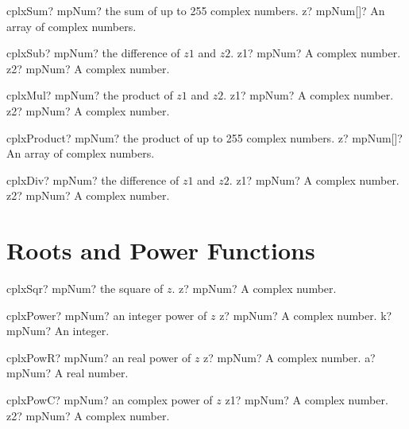 \documentclass[12pt,a4paper,openany]{book}
\begin{document}
\begin{mpFunctionsExtract}
\mpFunctionOne
{cplxSum? mpNum? the sum of up to 255 complex numbers.}
{z? mpNum[]? An array of complex numbers.}
\end{mpFunctionsExtract}

\begin{mpFunctionsExtract}
\mpFunctionTwo
{cplxSub? mpNum? the difference of $z1$ and $z2$.}
{z1? mpNum? A complex number.}
{z2? mpNum? A complex number.}
\end{mpFunctionsExtract}

\begin{mpFunctionsExtract}
\mpFunctionTwo
{cplxMul? mpNum? the product of $z1$ and $z2$.}
{z1? mpNum? A complex number.}
{z2? mpNum? A complex number.}
\end{mpFunctionsExtract}

\begin{mpFunctionsExtract}
\mpFunctionOne
{cplxProduct? mpNum? the product of up to 255 complex numbers.}
{z? mpNum[]? An array of complex numbers.}
\end{mpFunctionsExtract}

\begin{mpFunctionsExtract}
\mpFunctionTwo
{cplxDiv? mpNum? the difference of $z1$ and $z2$.}
{z1? mpNum? A complex number.}
{z2? mpNum? A complex number.}
\end{mpFunctionsExtract}

\section{Roots and Power Functions}

\begin{mpFunctionsExtract}
\mpFunctionOne
{cplxSqr? mpNum? the square of $z$.}
{z? mpNum? A complex number.}
\end{mpFunctionsExtract}

\begin{mpFunctionsExtract}
\mpFunctionTwo
{cplxPower? mpNum? an integer power of $z$}
{z? mpNum? A complex number.}
{k? mpNum? An integer.}
\end{mpFunctionsExtract}

\begin{mpFunctionsExtract}
\mpFunctionTwo
{cplxPowR? mpNum? an real power of $z$}
{z? mpNum? A complex number.}
{a? mpNum? A real number.}
\end{mpFunctionsExtract}

\begin{mpFunctionsExtract}
\mpFunctionTwo
{cplxPowC? mpNum? an complex power of $z$}
{z1? mpNum? A complex number.}
{z2? mpNum? A complex number.}
\end{mpFunctionsExtract}
\end{document}
